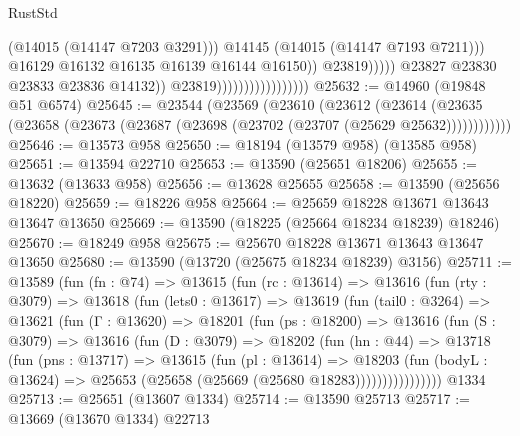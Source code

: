 \begin{lexlean}{RustStd}
\begin{coremodule}
                                                            (@14015 (@14147 @7203 @3291)))
                                                          @14145
                                                          (@14015 (@14147 @7193 @7211)))
                                                        @16129
                                                        @16132
                                                        @16135
                                                        @16139
                                                        @16144
                                                        @16150))
                                                    @23819)))))
                                          @23827
                                          @23830
                                          @23833
                                          @23836
                                          @14132))
                                      @23819)))))))))))))))))
@25632 := @14960 (@19848 @51 @6574)
@25645 := @23544
    (@23569
      (@23610
        (@23612
          (@23614 (@23635 (@23658 (@23673 (@23687 (@23698 (@23702 (@23707 (@25629 @25632))))))))))))
@25646 := @13573 @958
@25650 := @18194 (@13579 @958) (@13585 @958)
@25651 := @13594 @22710
@25653 := @13590 (@25651 @18206)
@25655 := @13632 (@13633 @958)
@25656 := @13628 @25655
@25658 := @13590 (@25656 @18220)
@25659 := @18226 @958
@25664 := @25659 @18228 @13671 @13643 @13647 @13650
@25669 := @13590 (@18225 (@25664 @18234 @18239) @18246)
@25670 := @18249 @958
@25675 := @25670 @18228 @13671 @13643 @13647 @13650
@25680 := @13590 (@13720 (@25675 @18234 @18239) @3156)
@25711 := @13589
    (fun (fn : @74) =>
    @13615
      (fun (rc : @13614) =>
      @13616
        (fun (rty : @3079) =>
        @13618
          (fun (lets0 : @13617) =>
          @13619
            (fun (tail0 : @3264) =>
            @13621
              (fun (Γ : @13620) =>
              @18201
                (fun (ps : @18200) =>
                @13616
                  (fun (S : @3079) =>
                  @13616
                    (fun (D : @3079) =>
                    @18202
                      (fun (hn : @44) =>
                      @13718
                        (fun (pns : @13717) =>
                        @13615
                          (fun (pl : @13614) =>
                          @18203
                            (fun (bodyL : @13624) =>
                            @25653 (@25658 (@25669 (@25680 @18283))))))))))))))))
    @1334
@25713 := @25651 (@13607 @1334)
@25714 := @13590 @25713
@25717 := @13669 (@13670 @1334) @22713

\end{coremodule}
\end{lexlean}
